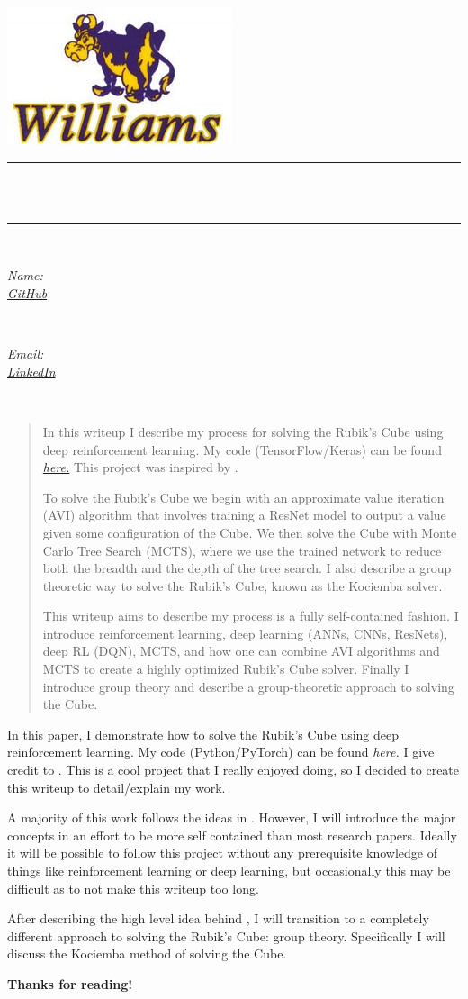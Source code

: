 \documentclass[12pt,oneside,oldfontcommands]{memoir}
\makeatletter
\theoremstyle{definition}
\def\maketitle{%
  \null
  \thispagestyle{empty}
  \begin{center}\leavevmode
       \normalfont
       \includegraphics[width=0.35\columnwidth]{williamslogo.jpg}
       \vskip 1.0cm
	\rule{\linewidth}{0.2 mm} \\[0.4 cm]
	{ \huge \bfseries \@title}\\
	\rule{\linewidth}{0.2 mm} \\[1.5 cm]
	
	\begin{minipage}{0.5\textwidth}
		\begin{flushleft} \large
			\emph{Name:} \student\\
                \href{https://github.com/jcheigh}{\emph{GitHub}}
			\end{flushleft}
			\end{minipage}~
			\begin{minipage}{0.4\textwidth}
			\begin{flushleft} \large
			\emph{Email:} \email\\        
                \href{https://www.linkedin.com/in/justin-cheigh/}{\emph{LinkedIn}}
		\end{flushleft}
	\end{minipage}\\[2 cm]
   \end{center}
   \vspace{1cm}
    \begin{abstract}
    In this writeup I describe my process for solving the Rubik's Cube using deep reinforcement learning. My code (TensorFlow/Keras) can be found \href{https://github.com/jcheigh/AI-Projects}{\emph{here.}} This project was inspired by \cite{main}. 

   To solve the Rubik's Cube we begin with an approximate value iteration (AVI) algorithm that involves training a ResNet model to output a value given some configuration of the Cube. We then solve the Cube with Monte Carlo Tree Search (MCTS), where we use the trained network to reduce both the breadth and the depth of the tree search. I also describe a group theoretic way to solve the Rubik's Cube, known as the Kociemba solver. 
   
   This writeup aims to describe my process is a fully self-contained fashion. I introduce reinforcement learning, deep learning (ANNs, CNNs, ResNets), deep RL (DQN), MCTS, and how one can combine AVI algorithms and MCTS to create a highly optimized Rubik's Cube solver. Finally I introduce group theory and describe a group-theoretic approach to solving the Cube. 
    \end{abstract}
   \vfill
   \null
   \small
   \cleardoublepage
  }
\makeatother
\begin{document}
\maketitle
\frontmatter
\let\cleardoublepage\clearpage
\mainmatter
\sloppy


\newpage



\begin{Section}[0- Introduction]
In this paper, I demonstrate how to solve the Rubik's Cube using deep reinforcement learning. My code (Python/PyTorch) can be found \href{https://github.com/jcheigh/AI-Projects}{\emph{here.}} I give credit to \cite{main}. This is a cool project that I really enjoyed doing, so I decided to create this writeup to detail/explain my work. 

\tcblower

A majority of this work follows the ideas in \cite{main}. However, I will introduce the major concepts in an effort to be more self contained than most research papers. Ideally it will be possible to follow this project without any prerequisite knowledge of things like reinforcement learning or deep learning, but occasionally this may be difficult as to not make this writeup too long. 

After describing the high level idea behind \cite{main}, I will transition to a completely different approach to solving the Rubik's Cube: group theory. Specifically I will discuss the Kociemba \cite{kociemba} method of solving the Cube. 

\begin{center}
\textbf{Thanks for reading! }
\end{center}
\end{Section}
\end{document}
